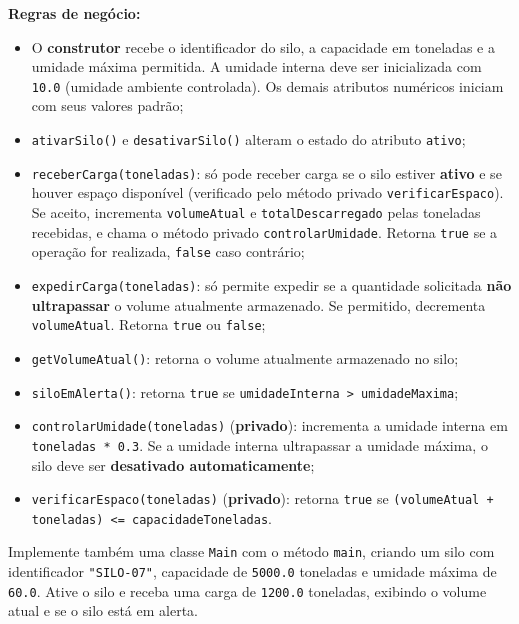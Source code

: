 \documentclass[12pt,a4paper]{article}
\newcommand{\resposta}[1]{
\noindent
\framebox[\textwidth]{
\begin{minipage}{0.98\textwidth}
\vspace{#1}
\end{minipage}
}
}
\begin{document}
\begin{enumerate}
    \textbf{Regras de negócio:}
    \begin{itemize}
        \item O \textbf{construtor} recebe o identificador do silo, a capacidade em toneladas e a umidade máxima permitida. A umidade interna deve ser inicializada com \texttt{10.0} (umidade ambiente controlada). Os demais atributos numéricos iniciam com seus valores padrão;
        \item \texttt{ativarSilo()} e \texttt{desativarSilo()} alteram o estado do atributo \texttt{ativo};
        \item \texttt{receberCarga(toneladas)}: só pode receber carga se o silo estiver \textbf{ativo} e se houver espaço disponível (verificado pelo método privado \texttt{verificarEspaco}). Se aceito, incrementa \texttt{volumeAtual} e \texttt{totalDescarregado} pelas toneladas recebidas, e chama o método privado \texttt{controlarUmidade}. Retorna \texttt{true} se a operação for realizada, \texttt{false} caso contrário;
        \item \texttt{expedirCarga(toneladas)}: só permite expedir se a quantidade solicitada \textbf{não ultrapassar} o volume atualmente armazenado. Se permitido, decrementa \texttt{volumeAtual}. Retorna \texttt{true} ou \texttt{false};
        \item \texttt{getVolumeAtual()}: retorna o volume atualmente armazenado no silo;
        \item \texttt{siloEmAlerta()}: retorna \texttt{true} se \texttt{umidadeInterna > umidadeMaxima};
        \item \texttt{controlarUmidade(toneladas)} (\textbf{privado}): incrementa a umidade interna em \texttt{toneladas * 0.3}. Se a umidade interna ultrapassar a umidade máxima, o silo deve ser \textbf{desativado automaticamente};
        \item \texttt{verificarEspaco(toneladas)} (\textbf{privado}): retorna \texttt{true} se \texttt{(volumeAtual + toneladas) <= capacidadeToneladas}.
    \end{itemize}

    Implemente também uma classe \texttt{Main} com o método \texttt{main}, criando um silo com identificador \texttt{"SILO-07"}, capacidade de \texttt{5000.0} toneladas e umidade máxima de \texttt{60.0}. Ative o silo e receba uma carga de \texttt{1200.0} toneladas, exibindo o volume atual e se o silo está em alerta.

    \resposta{22cm}

\end{enumerate}
\end{document}

